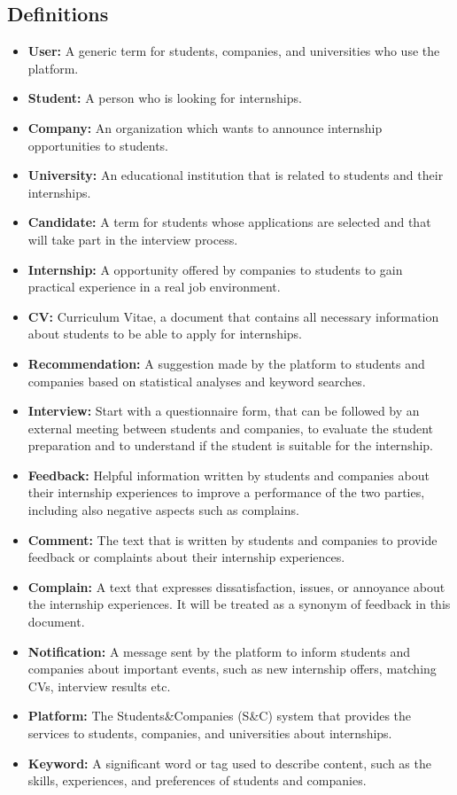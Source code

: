 \subsection{Definitions}\label{subsec:definitions}
\begin{itemize}
    \item \textbf{User:} A generic term for students, companies, and universities who use the platform.
    \item \textbf{Student:} A person who is looking for internships.
    \item \textbf{Company:} An organization which wants to announce internship opportunities to students.
    \item \textbf{University:} An educational institution that is related to students and their internships.
    \item \textbf{Candidate:} A term for students whose applications are selected and that will take part in the interview process.
    \item \textbf{Internship:} A opportunity offered by companies to students to gain practical experience in a real job environment.
    \item \textbf{CV:} Curriculum Vitae, a document that contains all necessary information about students to be able to apply for internships.
    \item \textbf{Recommendation:} A suggestion made by the platform to students and companies based on statistical analyses and keyword searches.
    \item \textbf{Interview:} Start with a questionnaire form, that can be followed by an external meeting between students and companies, to evaluate the
    student preparation and to understand if the student is suitable for the internship.
    \item \textbf{Feedback:} Helpful information written by students and companies about their internship experiences to improve a performance 
    of the two parties, including also negative aspects such as complains.
    \item \textbf{Comment:} The text that is written by students and companies to provide feedback or complaints about their internship experiences.
    \item \textbf{Complain:} A text that expresses dissatisfaction, issues, or annoyance about the internship experiences. It will be treated as a
    synonym of feedback in this document.
    \item \textbf{Notification:} A message sent by the platform to inform students and companies about important events, such as new internship 
    offers, matching CVs, interview results etc.
    \item \textbf{Platform:} The Students\&Companies (S\&C) system that provides the services to students, companies, and universities about
    internships.
    \item \textbf{Keyword:} A significant word or tag used to describe content, such as the skills, experiences, and preferences of students and 
    companies.

\end{itemize}

